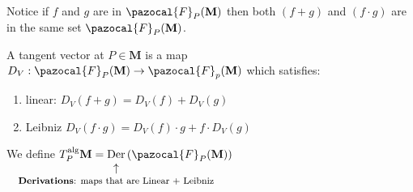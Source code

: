\documentclass[../main.tex]{subfiles}
\begin{document}
Notice if $f$ and $g$ are in $\pazocal{F}_P(\mathbf{M})$ then both $(f+g)$ and $(f\cdot g)$ are in the same set $\pazocal{F}_P(\mathbf{M})$.
\begin{definition}
A tangent vector at $P \in\mathbf{M}$ is a map $D_V:\pazocal{F}_P(\mathbf{M})\to\pazocal{F}_p(\mathbf{M})$ which satisfies:
\begin{enumerate}
    \item linear:  $D_V(f+g)=D_V(f)+D_V(g)$
    \item Leibniz $D_V(f\cdot g)=D_V(f)\cdot g+f\cdot D_V(g)$
\end{enumerate}
\end{definition}
\begin{definition}
We define
\(
T_P^{\textrm{alg}}\mathbf{M}=\underset{\mathclap{\tikz \node {$\uparrow$} node [below=1ex] {\footnotesize \textbf{Derivations}: maps that are Linear + Leibniz};}}{\textrm{Der}}\left(\pazocal{F}_P(\mathbf{M})\right)
\)
\end{definition}
\end{document}
